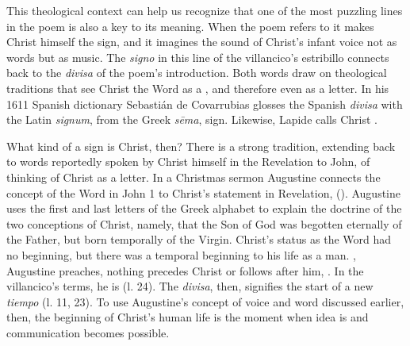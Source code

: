 This theological context can help us recognize that one of the most puzzling
lines in the poem is also a key to its meaning. 
When the poem refers to  it makes
Christ himself the sign, and it imagines the sound of Christ's infant voice not
as words but as music. 
The \emph{signo} in this line of the villancico's estribillo connects back to
the \emph{divisa} of the poem's introduction.
Both words draw on theological traditions that see Christ the Word as a
, and therefore even as a letter.
In his 1611 Spanish dictionary Sebastián de Covarrubias glosses the Spanish
\emph{divisa} with the Latin \emph{signum}, from the Greek \emph{sēma}, sign. 
Likewise, Lapide calls Christ .%
    \Autocites
    []{Covarrubias:Tesoro}
    [685--686, on Lk 2]{Lapide:Gospels19C} %

What kind of a sign is Christ, then?
There is a strong tradition, extending back to words reportedly spoken by Christ
himself in the Revelation to John, of thinking of Christ as a letter.
In a Christmas sermon Augustine connects the concept of the Word in John 1 to
Christ's statement in Revelation,  ().
Augustine uses the first and last letters of the Greek alphabet to explain the
doctrine of the two conceptions of Christ, namely, that the Son of God was
begotten eternally of the Father, but born temporally of the Virgin.
Christ's status as the Word had no beginning, but there was a temporal beginning
to his life as a man.
, Augustine preaches,
nothing precedes Christ or follows after him, .%
    \Autocites
    [vol. 10, 118r, In Natali Domini 2: .]
    {Augustine:Opera1555}
    [on Rv 1]{Lapide:Apocalypse1627}
In the villancico's terms, he is  (l. 24).
The \emph{divisa}, then, signifies the start of a new \emph{tiempo} (l.  11,
23).
To use Augustine's concept of voice and word discussed earlier, then, the
beginning of Christ's human life is the moment when idea is  and communication becomes possible.

